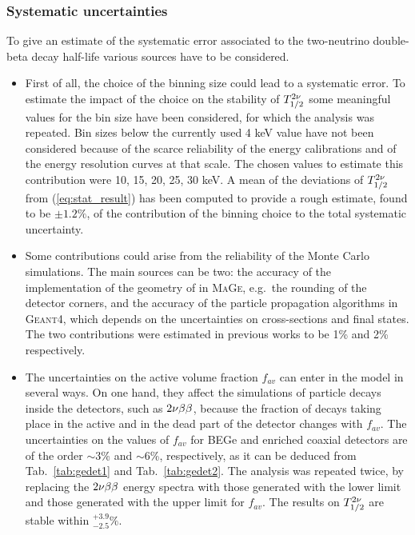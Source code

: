 \subsubsection*{Systematic uncertainties}
To give an estimate of the systematic error associated to the two-neutrino double-beta decay half-life various sources have to be considered.
\begin{itemize}
	\item First of all, the choice of the binning size could lead to a systematic error. To estimate the impact of the choice on the stability of $T_{1/2}^{2\nu}$ some meaningful values for the bin size have been considered, for which the analysis was repeated. Bin sizes below the currently used 4 keV value have not been considered because of the scarce reliability of the energy calibrations and of the energy resolution curves at that scale. The chosen values to estimate this contribution were 10, 15, 20, 25, 30 keV. A mean of the deviations of $T_{1/2}^{2\nu}$ from (\ref{eq:stat_result}) has been computed to provide a rough estimate, found to be $\pm1.2\%$, of the contribution of the binning choice to the total systematic uncertainty.
	\item Some contributions could arise from the reliability of the Monte Carlo simulations. The main sources can be two: the accuracy of the implementation of the geometry of {\gerda} in \textsc{MaGe}, e.g.~the rounding of the detector corners, and the accuracy of the particle propagation algorithms in \textsc{Geant4}, which depends on the uncertainties on cross-sections and final states. The two contributions were estimated in previous works to be 1\% \cite{gerda2nbb} and 2\% \cite{geant4sys1, geant4sys2, geant4sys3} respectively.
	\item The uncertainties on the active volume fraction $f_{av}$ can enter in the model in several ways. On one hand, they affect the simulations of particle decays inside the detectors, such as $2\nu\beta\beta$, because the fraction of decays taking place in the active and in the dead part of the detector changes with $f_{av}$. The uncertainties on the values of $f_{av}$ for BEGe and enriched coaxial detectors are of the order $\sim$3\% and $\sim$6\%, respectively, as it can be deduced from Tab.~\ref{tab:gedet1} and Tab.~\ref{tab:gedet2}. The analysis was repeated twice, by replacing the $2\nu\beta\beta$ energy spectra with those generated with the lower limit and those generated with the upper limit for $f_{av}$. The results on $T_{1/2}^{2\nu}$ are stable within $^{+3.9}_{-2.5}\%$.


\end{itemize}
